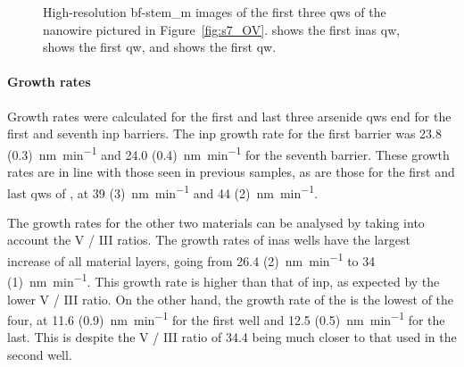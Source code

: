 \begin{figure}
{
    }
    \caption[High-resolution \acs{bf}-\acs{stem_m} images of the first three \acl{qw}s of the nanowire cross-section from sample 7.]{High-resolution \acs{bf}-\acs{stem_m} images of the first three \acl{qw}s of the nanowire pictured in Figure~\ref{fig:s7_OV}.  shows the first \acs{inas} \acl{qw},  shows the first  \acl{qw}, and  shows the first  \acl{qw}.}
    \label{fig:s7_well1-3_HR}
\end{figure}

\paragraph{Growth rates} Growth rates were calculated for the first and last three arsenide \acl{qw}s end for the first and seventh \acs{inp} barriers. The \acs{inp} growth rate for the first barrier was \qty[separate-uncertainty=true]{23.8 (0.3)}{\nano\metre\per\minute} and \qty[separate-uncertainty=true]{24.0 (0.4)}{\nano\metre\per\minute} for the seventh barrier. These growth rates are in line with those seen in previous samples, as are those for the first and last \acl{qw}s of , at \qty[separate-uncertainty=true]{39 (3)}{\nano\metre\per\minute} and \qty[separate-uncertainty=true]{44 (2)}{\nano\metre\per\minute}.

The growth rates for the other two materials can be analysed by taking into account the V / III ratios. The growth rates of \acs{inas} wells have the largest increase of all material layers, going from \qty[separate-uncertainty=true]{26.4 (2)}{\nano\metre\per\minute} to \qty[separate-uncertainty=true]{34 (1)}{\nano\metre\per\minute}. This growth rate is higher than that of \acs{inp}, as expected by the lower V / III ratio. On the other hand, the growth rate of the  is the lowest of the four, at \qty[separate-uncertainty=true]{11.6 (0.9)}{\nano\metre\per\minute} for the first well and \qty[separate-uncertainty=true]{12.5 (0.5)}{\nano\metre\per\minute} for the last. This is despite the V / III ratio of \num{34.4} being much closer to that used in the second well.  

